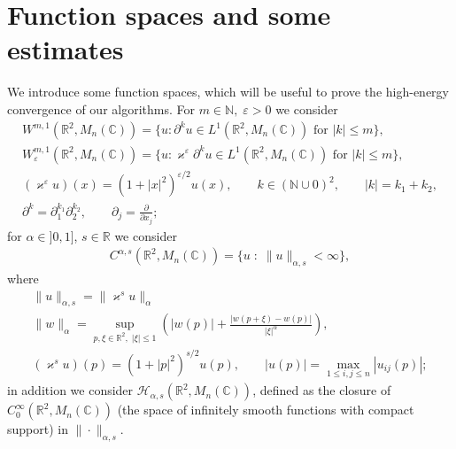 \documentclass[11pt,a4paper,english,subeqn]{amsart}
\theoremstyle{plain}
\theoremstyle{definition}
\numberwithin{equation}{section}
\begin{document}
\section{Function spaces and some estimates}
We introduce some function spaces, which will be useful to prove the high-energy convergence of our algorithms. For $m \in {\mathbb{N}}, \; \varepsilon >0$ we consider
\begin{gather*}
W^{m,1}({\mathbb{R}}^2, M_{n}({\mathbb{C}})) = \{ u : \partial^k u \in L^1({\mathbb{R}}^2, {M_{n}({\mathbb{C}})}) \text{ for } |k| \leq m \}, \\
W^{m,1}_{\varepsilon}({\mathbb{R}}^2, M_{n}({\mathbb{C}})) = \{ u : \varkappa^{\varepsilon}\partial^k u \in L^1({\mathbb{R}}^2, {M_{n}({\mathbb{C}})}) \text{ for } |k| \leq m \}, \\
(\varkappa^{\varepsilon}u)(x) = (1+|x|^2)^{\varepsilon /2} u(x), \qquad k \in ({\mathbb{N}} \cup 0)^2, \qquad |k| = k_1 + k_2, \\
\partial^k = \partial_1^{k_1} \partial_2^{k_2}, \qquad \partial_j = \frac{\partial}{\partial x_j};
\end{gather*}
for $ \alpha \in ] 0, 1]$, $s \in {\mathbb{R}}$ we consider
\begin{gather*}
C^{\alpha,s}({\mathbb{R}}^2, {M_{n}({\mathbb{C}})}) = \{u \; : \; \| u\|_{\alpha,s} < \infty \},
\end{gather*}
where
\begin{gather*}
\|u\|_{\alpha, s} = \| \varkappa^s u\|_{\alpha}\\ 
\|w\|_{\alpha}= \sup_{p, \xi \in {\mathbb{R}}^2, \; |\xi| \leq 1} \left(|w(p)| +\frac{|w(p+\xi)-w(p)|}{|\xi|^{\alpha}}\right),\\
(\varkappa^s u)(p) = (1+ |p|^2)^{s/2} u(p), \qquad |u(p)| = \max_{1 \leq i,j \leq n} |u_{ij}(p)|;
\end{gather*}
in addition we consider $\mathcal{H}_{\alpha,s}({\mathbb{R}}^2, {M_{n}({\mathbb{C}})})$, defined as the closure of $C^{\infty}_0 ({\mathbb{R}}^2, {M_{n}({\mathbb{C}})})$ (the space of infinitely smooth functions with compact support) in $\| \cdot \|_{\alpha, s}$.
\end{document}
